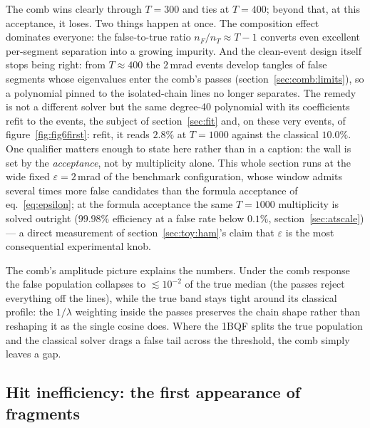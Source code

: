 \documentclass[11pt,a4paper]{article}
\begin{document}
The comb wins clearly through $T=300$ and ties at $T=400$; beyond
that, at this acceptance, it loses. Two things happen at once. The
composition effect dominates everyone: the false-to-true ratio
$n_F/n_T\approx T-1$ converts even excellent per-segment separation
into a growing impurity. And the clean-event design itself stops
being right: from $T\approx400$ the $2$\,mrad events develop tangles
of false segments whose eigenvalues enter the comb's passes
(section~\ref{sec:comb:limits}), so a polynomial pinned to the
isolated-chain lines no longer separates. The remedy is not a
different solver but the same degree-40 polynomial with its
coefficients refit to the events, the subject of
section~\ref{sec:fit} and, on these very events, of
figure~\ref{fig:fig6first}: refit, it reads $2.8\%$ at $T=1000$
against the classical $10.0\%$. One qualifier matters enough to
state here rather than in a caption: the wall is set by the
\emph{acceptance}, not by multiplicity alone. This whole section runs
at the wide fixed $\varepsilon=2$\,mrad of the benchmark
configuration, whose window admits several times more false
candidates than the formula acceptance of eq.~\eqref{eq:epsilon}; at
the formula acceptance the same $T=1000$ multiplicity is solved
outright ($99.98\%$ efficiency at a false rate below $0.1\%$,
section~\ref{sec:atscale}) — a direct measurement of
section~\ref{sec:toy:ham}'s claim that $\varepsilon$ is the most
consequential experimental knob.

The comb's amplitude picture explains the numbers. Under the comb
response the false population collapses to $\lesssim10^{-2}$ of the
true median (the passes reject everything off the lines), while the
true band stays tight around its classical profile: the $1/\lambda$
weighting inside the passes preserves the chain shape rather than
reshaping it as the single cosine does. Where the 1BQF splits the
true population and the classical solver drags a false tail across
the threshold, the comb simply leaves a gap.

\subsection{Hit inefficiency: the first appearance of fragments}
\label{sec:comb:drop}
\end{document}
